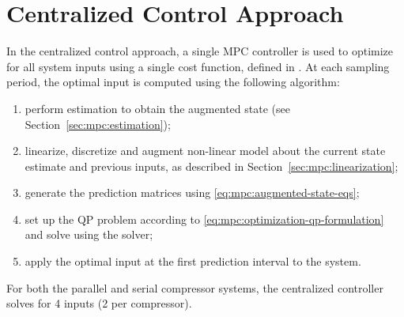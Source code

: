 \section{Centralized Control Approach}
\label{sec:mpc:centralized}

In the centralized control approach, a single MPC controller is used to optimize for all system inputs using a single cost function, defined in .
At each sampling period, the optimal input is computed using the following algorithm:

\begin{enumerate}
  \item perform estimation to obtain the augmented state (see Section~\ref{sec:mpc:estimation});
  \item linearize, discretize and augment non-linear model about the current state estimate and previous inputs, as described in Section~\ref{sec:mpc:linearization};
  \item generate the prediction matrices using \eqref{eq:mpc:augmented-state-eqs};
  \item set up the QP problem according to \eqref{eq:mpc:optimization-qp-formulation} and solve using the \qpoases{} solver;
  \item apply the optimal input at the first prediction interval to the system.
\end{enumerate}

For both the parallel and serial compressor systems, the centralized controller solves for 4 inputs (2 per compressor). 

